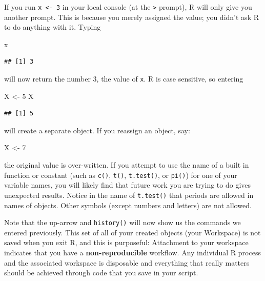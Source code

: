 \documentclass[
]{book}
\newenvironment{Shaded}{\begin{snugshade}}{\end{snugshade}}
\newcommand{\DecValTok}[1]{\textcolor[rgb]{0.00,0.00,0.81}{#1}}
\newcommand{\NormalTok}[1]{#1}
\newcommand{\OtherTok}[1]{\textcolor[rgb]{0.56,0.35,0.01}{#1}}
\begin{document}
If you run \texttt{x\ \textless{}-\ 3} in your local console (at the \texttt{\textgreater{}} prompt), R will only give you another prompt. This is because you merely assigned the value; you didn't ask R to do anything with it. Typing

\begin{Shaded}
\begin{Highlighting}[]
\NormalTok{x}
\end{Highlighting}
\end{Shaded}

\begin{verbatim}
## [1] 3
\end{verbatim}

will now return the number 3, the value of \texttt{x}. R is case sensitive, so entering

\begin{Shaded}
\begin{Highlighting}[]
\NormalTok{X }\OtherTok{\textless{}{-}} \DecValTok{5}
\NormalTok{X}
\end{Highlighting}
\end{Shaded}

\begin{verbatim}
## [1] 5
\end{verbatim}

will create a separate object. If you reassign an object, say:

\begin{Shaded}
\begin{Highlighting}[]
\NormalTok{X }\OtherTok{\textless{}{-}} \DecValTok{7}
\end{Highlighting}
\end{Shaded}

the original value is over-written. If you attempt to use the name of a built in function or constant (such as \texttt{c()}, \texttt{t()}, \texttt{t.test()}, or \texttt{pi()}) for one of your variable names, you will likely find that future work you are trying to do gives unexpected results. Notice in the name of \texttt{t.test()} that periods are allowed in names of objects. Other symbols (except numbers and letters) are not allowed.

Note that the up-arrow and \texttt{history()} will now show us the commands we entered previously. This set of all of your created objects (your Workspace) is not saved when you exit R, and this is purposeful: Attachment to your workspace indicates that you have a \textbf{non-reproducible} workflow. Any individual R process and the associated workspace is disposable and everything that really matters should be achieved through code that you save in your script.
\end{document}

